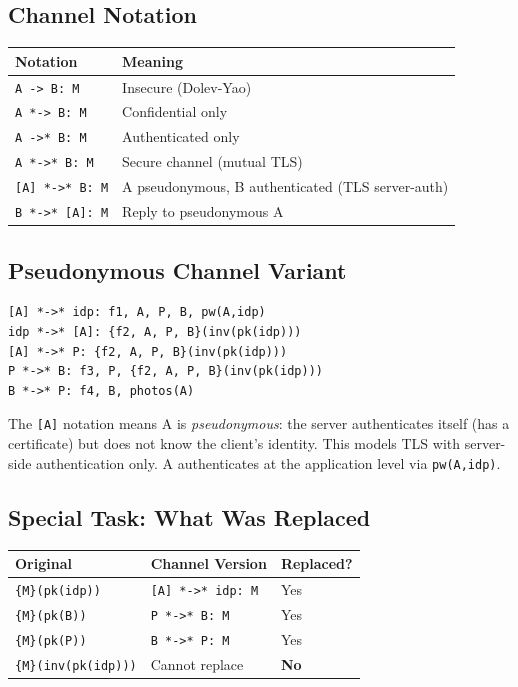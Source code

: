 \documentclass[11pt,a4paper]{article}
\begin{document}
\subsection{Channel Notation}
\begin{center}
\begin{tabular}{ll}
\toprule
Notation & Meaning \\
\midrule
\texttt{A -> B: M} & Insecure (Dolev-Yao) \\
\texttt{A *-> B: M} & Confidential only \\
\texttt{A ->* B: M} & Authenticated only \\
\texttt{A *->* B: M} & Secure channel (mutual TLS) \\
\texttt{[A] *->* B: M} & A pseudonymous, B authenticated (TLS server-auth) \\
\texttt{B *->* [A]: M} & Reply to pseudonymous A \\
\bottomrule
\end{tabular}
\end{center}

\subsection{Pseudonymous Channel Variant}
\begin{lstlisting}[style=anb,caption={Week 5: Pseudonymous TLS channels}]
[A] *->* idp: f1, A, P, B, pw(A,idp)
idp *->* [A]: {f2, A, P, B}(inv(pk(idp)))
[A] *->* P: {f2, A, P, B}(inv(pk(idp)))
P *->* B: f3, P, {f2, A, P, B}(inv(pk(idp)))
B *->* P: f4, B, photos(A)
\end{lstlisting}

The \texttt{[A]} notation means A is \emph{pseudonymous}: the server authenticates itself (has
a certificate) but does not know the client's identity. This models TLS with server-side
authentication only. A authenticates at the application level via \texttt{pw(A,idp)}.

\subsection{Special Task: What Was Replaced}
\begin{center}
\begin{tabular}{lll}
\toprule
Original & Channel Version & Replaced? \\
\midrule
\texttt{\{M\}(pk(idp))} & \texttt{[A] *->* idp: M} & Yes \\
\texttt{\{M\}(pk(B))} & \texttt{P *->* B: M} & Yes \\
\texttt{\{M\}(pk(P))} & \texttt{B *->* P: M} & Yes \\
\texttt{\{M\}(inv(pk(idp)))} & Cannot replace & \textbf{No} \\
\bottomrule
\end{tabular}
\end{center}
\end{document}
